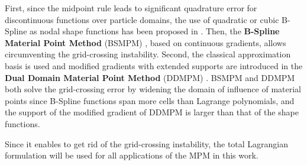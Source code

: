 First, since the midpoint rule leads to significant quadrature error for discontinuous functions over particle domains, the use of quadratic or cubic B-Spline as nodal shape functions has been proposed in \cite{Steffen_quadError}.  
Then, the \textbf{B-Spline Material Point Method} (BSMPM) \cite{MPM_BSpline1}, based on continuous gradients, allows circumventing the grid-crossing instability. 
Second, the classical approximation basis is used and modified gradients with extended supports are introduced in the \textbf{Dual Domain Material Point Method} (DDMPM) \cite{DDMPM0}.
BSMPM and DDMPM  both solve the grid-crossing error by widening the domain of influence of material points since B-Spline functions span more cells than Lagrange polynomials, and the support of the modified gradient of DDMPM is larger than that of the shape functions.

\begin{remark}
  Since it enables to get rid of the grid-crossing instability, the total Lagrangian formulation will be used for all applications of the MPM in this work.
\end{remark}

